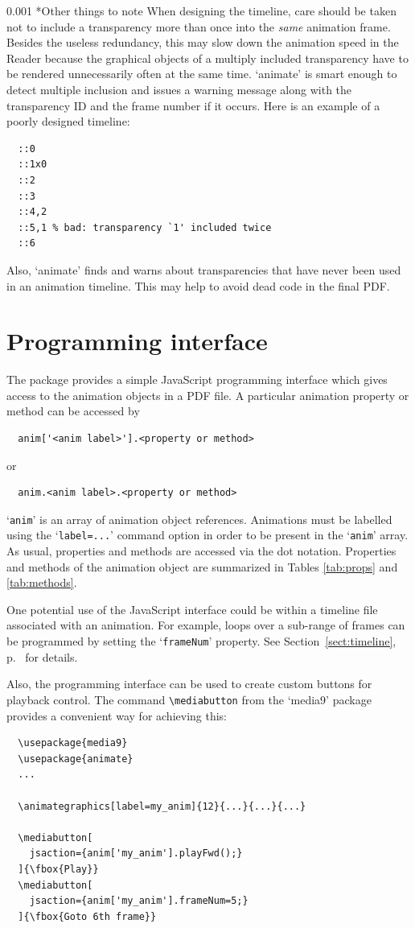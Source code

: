 \documentclass[a4paper]{article}
\makeatletter
\newcommand\myparagraph{\@startsection{paragraph}{3}{\z@}%
                                     {\parskip}%
                                     {0.001\parskip}%
                                     {\itshape\normalsize}}
\makeatother
\begin{document}
\myparagraph*{Other things to note}
When designing the timeline, care should be taken not to include a transparency more than once into the \emph{same} animation frame. Besides the useless redundancy, this may slow down the animation speed in the Reader because the graphical objects of a multiply included transparency have to be rendered unnecessarily often at the same time. `animate' is smart enough to detect multiple inclusion and issues a warning message along with the transparency ID and the frame number if it occurs. Here is an example of a poorly designed timeline:
\small
\begin{verbatim}
  ::0
  ::1x0
  ::2
  ::3
  ::4,2
  ::5,1 % bad: transparency `1' included twice
  ::6
\end{verbatim}
\normalsize
Also, `animate' finds and warns about transparencies that have never been used in an animation timeline. This may help to avoid dead code in the final PDF.

\section{Programming interface}\label{sect:api}
The package provides a simple JavaScript programming interface which gives access to the animation objects in a PDF file. A particular animation property or method can be accessed by
\begin{verbatim}
  anim['<anim label>'].<property or method>
\end{verbatim}
or
\begin{verbatim}
  anim.<anim label>.<property or method>
\end{verbatim}
`\verb+anim+' is an array of animation object references. Animations must be labelled using the `\verb+label=...+' command option in order to be present in the `\verb+anim+' array. As usual, properties and methods are accessed via the dot notation. Properties and methods of the animation object are summarized in Tables \ref{tab:props} and \ref{tab:methods}.

One potential use of the JavaScript interface could be within a timeline file associated with an animation. For example, loops over a sub-range of frames can be programmed by setting the `\verb+frameNum+' property. See Section~\ref{sect:timeline}, p.~\pageref{sect:jsfield} for details.

Also, the programming interface can be used to create custom buttons for playback control. The command \verb+\mediabutton+ from the `media9' package provides a convenient way for achieving this:
\begin{verbatim}
  \usepackage{media9}
  \usepackage{animate}
  ...

  \animategraphics[label=my_anim]{12}{...}{...}{...}

  \mediabutton[
    jsaction={anim['my_anim'].playFwd();}
  ]{\fbox{Play}}
  \mediabutton[
    jsaction={anim['my_anim'].frameNum=5;}
  ]{\fbox{Goto 6th frame}}
\end{verbatim}
\end{document}
